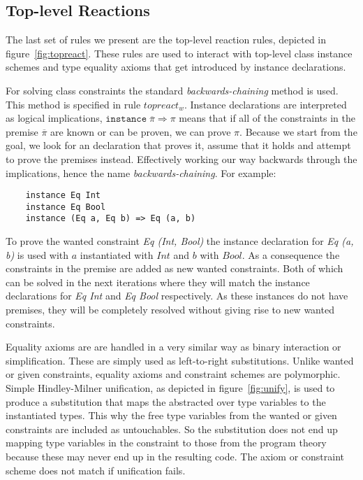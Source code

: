 \subsection{Top-level Reactions}
The last set of rules we present are the top-level reaction rules, depicted
in figure~\ref{fig:topreact}. These rules are used to interact with top-level
class instance schemes and type equality axioms that get introduced by instance
declarations.

For solving class constraints the standard \textit{backwards-chaining} method is
used. This method is specified in rule $topreact_w$. Instance declarations
are interpreted as logical implications, $\texttt{instance} \; \overline{\pi}
\Rightarrow \pi$ means that if all of the constraints in the premise
$\overline{\pi}$ are known or can be proven, we can prove $\pi$. Because we
start from the goal, we look for an declaration that proves it, assume that it
holds and attempt to prove the premises instead. Effectively working our way
backwards through the implications, hence the name \textit{backwards-chaining}.
For example:
\begin{verbatim}
    instance Eq Int
    instance Eq Bool
    instance (Eq a, Eq b) => Eq (a, b)
\end{verbatim}
To prove the wanted constraint \textit{Eq (Int, Bool)} the instance declaration
for \textit{Eq (a, b)} is used with $a$ instantiated with $Int$ and $b$ with
$Bool$. As a consequence the constraints in the premise are added as new wanted
constraints. Both of which can be solved in the next iterations where they will
match the instance declarations for \textit{Eq Int} and \textit{Eq Bool}
respectively. As these instances do not have premises, they will be completely
resolved without giving rise to new wanted constraints.

Equality axioms are are handled in a very similar way as binary interaction or
simplification. These are simply used as left-to-right substitutions. Unlike
wanted or given constraints, equality axioms and constraint schemes are
polymorphic. Simple Hindley-Milner\cite{hindley}\cite{damas-milner} unification,
as depicted in
figure~\ref{fig:unify}, is used to produce a substitution that maps the
abstracted over type variables to the instantiated types. This why the free type
variables from the wanted or given constraints are included as untouchables. So
the substitution does not end up mapping type variables in the constraint to
those from the program theory because these may never end up in the resulting
\systemfc code. The axiom or constraint scheme does not match if
unification fails.

